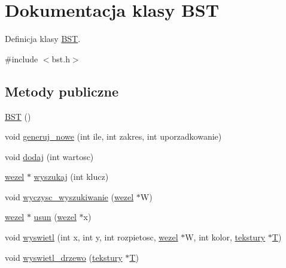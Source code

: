 \hypertarget{class_b_s_t}{}\section{Dokumentacja klasy B\+ST}
\label{class_b_s_t}


Definicja klasy \mbox{\hyperlink{class_b_s_t}{B\+ST}}.  




{\ttfamily \#include $<$bst.\+h$>$}

\subsection*{Metody publiczne}
\begin{DoxyCompactItemize}
\item 
\mbox{\hyperlink{class_b_s_t_abc17123a0367c3b8ad0382eeb3ad3178}{B\+ST}} ()
\item 
void \mbox{\hyperlink{class_b_s_t_ae5f20b665705c82452690ba682f867a6}{generuj\+\_\+nowe}} (int ile, int zakres, int uporzadkowanie)
\item 
void \mbox{\hyperlink{class_b_s_t_a14df9d739a34fd8c391c07df9e5ca1d3}{dodaj}} (int wartosc)
\item 
\mbox{\hyperlink{classwezel}{wezel}} $\ast$ \mbox{\hyperlink{class_b_s_t_a1b0748887eae594e90cfe2494baa29ea}{wyszukaj}} (int klucz)
\item 
void \mbox{\hyperlink{class_b_s_t_acd478acd615c38053ca2e28e217c43fe}{wyczysc\+\_\+wyszukiwanie}} (\mbox{\hyperlink{classwezel}{wezel}} $\ast$W)
\item 
\mbox{\hyperlink{classwezel}{wezel}} $\ast$ \mbox{\hyperlink{class_b_s_t_a67b2888aec856d1e00e569a1feabf905}{usun}} (\mbox{\hyperlink{classwezel}{wezel}} $\ast$x)
\item 
void \mbox{\hyperlink{class_b_s_t_a538330cbdb455f7e676db5ee9ef29f54}{wyswietl}} (int x, int y, int rozpietosc, \mbox{\hyperlink{classwezel}{wezel}} $\ast$W, int kolor, \mbox{\hyperlink{classtekstury}{tekstury}} $\ast$\mbox{\hyperlink{main_8cpp_ab6e212a94c16ea306129c2e8e004bd6f}{T}})
\item 
void \mbox{\hyperlink{class_b_s_t_a7605bbad3398366c380300c97eed9ace}{wyswietl\+\_\+drzewo}} (\mbox{\hyperlink{classtekstury}{tekstury}} $\ast$\mbox{\hyperlink{main_8cpp_ab6e212a94c16ea306129c2e8e004bd6f}{T}})
\end{DoxyCompactItemize}
